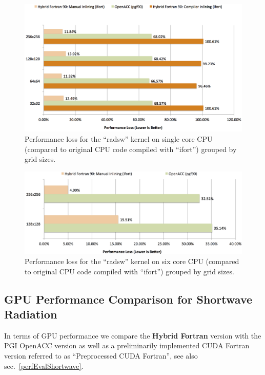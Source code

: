 \begin{figure}[htpb]
        \centering
        \includegraphics[width=14cm]{figures/verificationLossVS1Core}
        \caption[CPU Single Core Performance Loss of Sample Implementation]{Performance loss for the ``radsw'' kernel on single core CPU (compared to original CPU code compiled with ``ifort'') grouped by grid sizes.}
        \label{figure:verificationLossVS1Core}
\end{figure}

\begin{figure}[htpb]
        \centering
        \includegraphics[width=14cm]{figures/verificationLossVS6Core}
        \caption[CPU Six Core Performance Loss of Sample Implementation]{Performance loss for the ``radsw'' kernel on six core CPU (compared to original CPU code compiled with ``ifort'') grouped by grid sizes.}
        \label{figure:verificationLossVS6Core}
\end{figure}

\clearpage
\subsection{GPU Performance Comparison for Shortwave Radiation} \label{sub:performanceGPUValidation}

In terms of GPU performance we compare the \textbf{Hybrid Fortran} version with the PGI OpenACC version as well as a preliminarily implemented CUDA Fortran version referred to as \textquotedblleft Preprocessed CUDA Fortran\textquotedblright, see also sec.~\ref{perfEvalShortwave}. 

